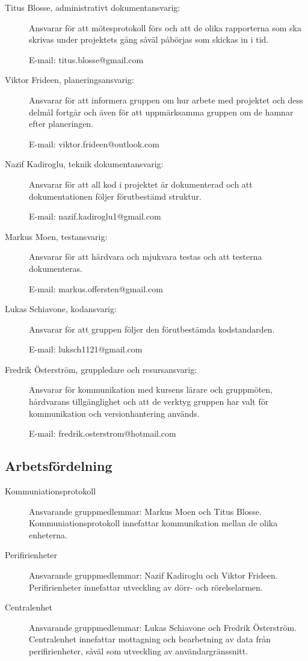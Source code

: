 \documentclass[a4paper]{article}
\begin{document}
\begin{description}
    \item[Titus Blosse, administrativt dokumentansvarig:] Ansvarar för att mötesprotokoll förs och att de olika rapporterna som ska skrivas under projektets gång såväl påbörjas som skickas in i tid.

    E-mail: titus.blosse@gmail.com

    \item[Viktor Frideen, planeringsansvarig:] Ansvarar för att informera gruppen om hur arbete med projektet och dess delmål fortgår och även för att uppmärksamma gruppen om de hamnar efter planeringen.

    E-mail: viktor.frideen@outlook.com

    \item[Nazif Kadiroglu, teknik dokumentansvarig:] Ansvarar för att all kod i projektet är dokumenterad och att dokumentationen följer förutbestämd struktur.

    E-mail: nazif.kadiroglu1@gmail.com

    \item[Markus Moen, testansvarig:] Ansvarar för att hårdvara och mjukvara testas och att testerna dokumenteras.

    E-mail: markus.offersten@gmail.com

    \item[Lukas Schiavone, kodansvarig:] Ansvarar för att gruppen följer den förutbestämda kodstandarden.

    E-mail: luksch1121@gmail.com

    \item[Fredrik Österström, gruppledare och resursansvarig:] Ansvarar för kommunikation med kursens lärare och gruppmöten, hårdvarans tillgänglighet och att de verktyg gruppen har valt för kommunikation och versionhantering används.

    E-mail: fredrik.osterstrom@hotmail.com
\end{description}

\subsection{Arbetsfördelning}

\begin{description}
    \item[Kommuniationsprotokoll] Ansvarande gruppmedlemmar: Markus Moen och Titus Blosse. Kommuniationsprotokoll innefattar kommunikation mellan de olika enheterna.
     
    \item[Perifirienheter] Ansvarande gruppmedlemmar: Nazif Kadiroglu och Viktor Frideen. Perifirienheter innefattar utveckling av dörr- och rörelselarmen.
     
    \item[Centralenhet] Ansvarande gruppmedlemmar: Lukas Schiavone och Fredrik Österström. Centralenhet innefattar mottagning och bearbetning av data från perifirienheter, såväl som utveckling av användargränssnitt.
\end{description}
\end{document}
